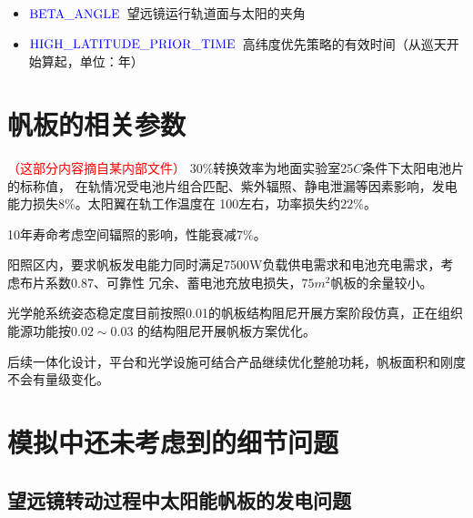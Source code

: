 \documentclass[a4paper,11pt]{ctexart}
\newcommand{\RT}[1]{\textcolor{red}{#1}}
\newcommand{\BT}[1]{\textcolor{blue}{#1}}
\begin{document}
\begin{itemize}
\item $\rm \BT{BETA\_ANGLE}$~望远镜运行轨道面与太阳的夹角
\item $\rm \BT{HIGH\_LATITUDE\_PRIOR\_TIME}$~高纬度优先策略的有效时间（从巡天开始算起，单位：年）
\end{itemize}

\section{帆板的相关参数}
\label{sec:panel_params}
\RT{（这部分内容摘自某内部文件）}
$30\%$转换效率为地面实验室25\textdegree $C$条件下太阳电池片的标称值，
在轨情况受电池片组合匹配、紫外辐照、静电泄漏等因素影响，发电能力损失$8\%$。太阳翼在轨工作温度在
100\textdegree 左右，功率损失约$22\%$。

10年寿命考虑空间辐照的影响，性能衰减$7\%$。

阳照区内，要求帆板发电能力同时满足7500W负载供电需求和电池充电需求，考虑布片系数0.87、可靠性
冗余、蓄电池充放电损失，$75m^2$帆板的余量较小。

光学舱系统姿态稳定度目前按照0.01的帆板结构阻尼开展方案阶段仿真，正在组织能源功能按$0.02\sim 0.03$
的结构阻尼开展帆板方案优化。

后续一体化设计，平台和光学设施可结合产品继续优化整舱功耗，帆板面积和刚度不会有量级变化。

\section{模拟中还未考虑到的细节问题}

\subsection{望远镜转动过程中太阳能帆板的发电问题}
\end{document}
